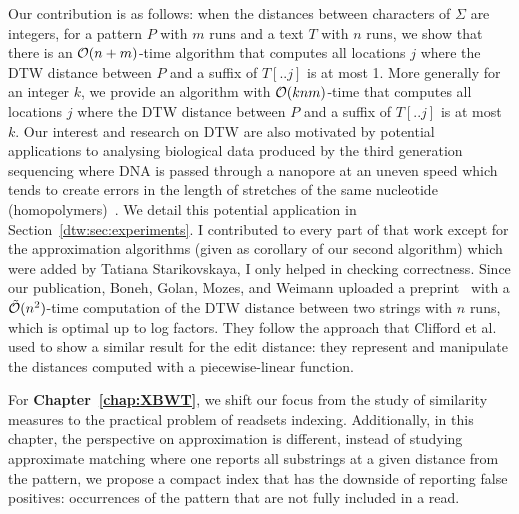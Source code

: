 Our contribution is as follows: when the distances between characters of $\Sigma$ are integers, for a pattern $P$ with $m$ runs and a text $T$ with $n$ runs, we show that there is an $\mathcal{O}(n+m)$-time algorithm that computes all locations $j$ where the DTW distance between $P$ and a suffix of $T[..j]$ is at most 1. More generally for an integer $k$, we provide an algorithm with $\mathcal{O}(knm)$-time that computes all locations $j$ where the DTW distance between $P$ and a suffix of $T[..j]$ is at most $k$.
Our interest and research on DTW are also motivated by potential applications to analysing biological data produced by the third generation sequencing where DNA is passed through a nanopore at an uneven speed which tends to create errors in the length of stretches of the same nucleotide (homopolymers)~\cite{delahaye2021sequencing}. We detail this potential application in Section~\ref{dtw:sec:experiments}.
I contributed to every part of that work except for the approximation algorithms (given as corollary of our second algorithm) which were added by Tatiana Starikovskaya, I only helped in checking correctness.
Since our publication, Boneh, Golan, Mozes, and Weimann uploaded a preprint~\cite{boneh2023near} with a $\tilde{\mathcal{O}}(n^2)$-time computation of the DTW distance between two strings with $n$ runs, which is optimal up to log factors. They follow the approach that Clifford et al.~\cite{clifford2019rle} used to show a similar result for the edit distance: they represent and manipulate the distances computed with a piecewise-linear function.



For \textbf{Chapter~\ref{chap:XBWT}}, we shift our focus from the study of similarity measures to the practical problem of readsets indexing. 
Additionally, in this chapter, the perspective on approximation is different, instead of studying approximate matching where one reports all substrings at a given distance from the pattern, we propose a compact index that has the downside of reporting false positives: occurrences of the pattern that are not fully included in a read.


